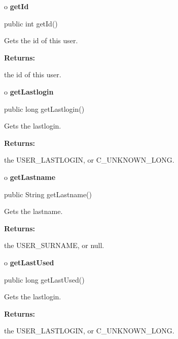 o {\bf getId} 

\begin{PRE}
 public int getId()
\end{PRE}

\begin{description}
\htmlDD Gets the id of this user. 

\begin{description}
\item {\bf Returns:}  

the id of this user.  
\end{description}

\end{description}

o {\bf getLastlogin} 

\begin{PRE}
 public long getLastlogin()
\end{PRE}

\begin{description}
\htmlDD Gets the lastlogin. 

\begin{description}
\item {\bf Returns:}  

the USER\_LASTLOGIN, or C\_UNKNOWN\_LONG.  
\end{description}

\end{description}

o {\bf getLastname} 

\begin{PRE}
 public String getLastname()
\end{PRE}

\begin{description}
\htmlDD Gets the lastname. 

\begin{description}
\item {\bf Returns:}  

the USER\_SURNAME, or null.  
\end{description}

\end{description}

o {\bf getLastUsed} 

\begin{PRE}
 public long getLastUsed()
\end{PRE}

\begin{description}
\htmlDD Gets the lastlogin. 

\begin{description}
\item {\bf Returns:}  

the USER\_LASTLOGIN, or C\_UNKNOWN\_LONG.  
\end{description}

\end{description}

